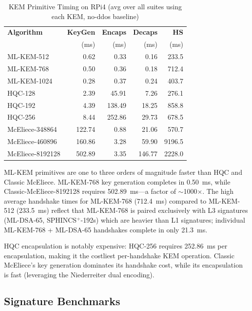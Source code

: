 \documentclass[conference]{IEEEtran}
\begin{document}
\begin{table}[t]
\centering
\caption{KEM Primitive Timing on RPi4 (avg over all suites using each KEM, no-ddos baseline)}
\label{tab:kem-timing}
\small
\begin{tabular}{@{}lrrrr@{}}
\toprule
\textbf{Algorithm} & \textbf{KeyGen} & \textbf{Encaps} & \textbf{Decaps} & \textbf{HS} \\
 & (ms) & (ms) & (ms) & (ms) \\
\midrule
ML-KEM-512 & 0.62 & 0.33 & 0.16 & 233.5 \\
ML-KEM-768 & 0.50 & 0.36 & 0.18 & 712.4 \\
ML-KEM-1024 & 0.28 & 0.37 & 0.24 & 403.7 \\
\midrule
HQC-128 & 2.39 & 45.91 & 7.26 & 276.1 \\
HQC-192 & 4.39 & 138.49 & 18.25 & 858.8 \\
HQC-256 & 8.44 & 252.86 & 29.73 & 678.5 \\
\midrule
McEliece-348864 & 122.74 & 0.88 & 21.06 & 570.7 \\
McEliece-460896 & 160.86 & 3.28 & 59.90 & 9196.5 \\
McEliece-8192128 & 502.89 & 3.35 & 146.77 & 2228.0 \\
\bottomrule
\end{tabular}
\end{table}

ML-KEM primitives are one to three orders of magnitude faster than HQC and Classic McEliece.
ML-KEM-768 key generation completes in \SI{0.50}{\milli\second}, while Classic-McEliece-8192128 requires \SI{502.89}{\milli\second}---a factor of $\sim$1000$\times$.
The high average handshake times for ML-KEM-768 (\SI{712.4}{\milli\second}) compared to ML-KEM-512 (\SI{233.5}{\milli\second}) reflect that ML-KEM-768 is paired exclusively with L3 signatures (ML-DSA-65, SPHINCS$^+$-192s) which are heavier than L1 signatures; individual ML-KEM-768 + ML-DSA-65 handshakes complete in only \SI{21.3}{\milli\second}.

HQC encapsulation is notably expensive: HQC-256 requires \SI{252.86}{\milli\second} per encapsulation, making it the costliest per-handshake KEM operation.
Classic McEliece's key generation dominates its handshake cost, while its encapsulation is fast (leveraging the Niederreiter dual encoding).

\subsection{Signature Benchmarks}
\end{document}
